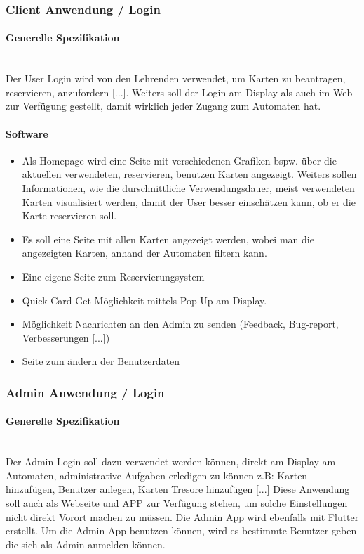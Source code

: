 \documentclass[a4paper]{article}
\begin{document}
\subsubsection{Client Anwendung / Login}
\paragraph{Generelle Spezifikation}\mbox{}\\
Der User Login wird von den Lehrenden verwendet, um Karten zu beantragen, reservieren, anzufordern [...]. Weiters soll der Login am Display als auch im Web zur Verfügung gestellt, damit wirklich jeder Zugang zum Automaten hat. 

\paragraph{Software}
\begin{itemize}
  \item Als Homepage wird eine Seite mit verschiedenen Grafiken bspw. über die aktuellen verwendeten, reservieren, benutzen Karten angezeigt. Weiters sollen Informationen, wie die durschnittliche Verwendungsdauer, meist verwendeten Karten visualisiert werden, damit der User besser einschätzen kann, ob er die Karte reservieren soll.
  \item Es soll eine Seite mit allen Karten angezeigt werden, wobei man die angezeigten Karten, anhand der Automaten filtern kann.
  \item Eine eigene Seite zum Reservierungsystem
  \item Quick Card Get Möglichkeit mittels Pop-Up am Display.
  \item Möglichkeit Nachrichten an den Admin zu senden (Feedback, Bug-report, Verbesserungen [...])
  \item Seite zum \"andern der Benutzerdaten
\end{itemize}



\subsubsection{Admin Anwendung / Login}
\paragraph{Generelle Spezifikation}\mbox{}\\
Der Admin Login soll dazu verwendet werden können, direkt am Display am Automaten, administrative Aufgaben erledigen zu können z.B: Karten hinzufügen, Benutzer anlegen, Karten Tresore hinzufügen [...] Diese Anwendung soll auch als Webseite und APP zur Verfügung stehen, um solche Einstellungen nicht direkt Vorort machen zu müssen. Die Admin App wird ebenfalls mit Flutter erstellt. Um die Admin App benutzen können, wird es bestimmte Benutzer geben die sich als Admin anmelden können. 
\end{document}
